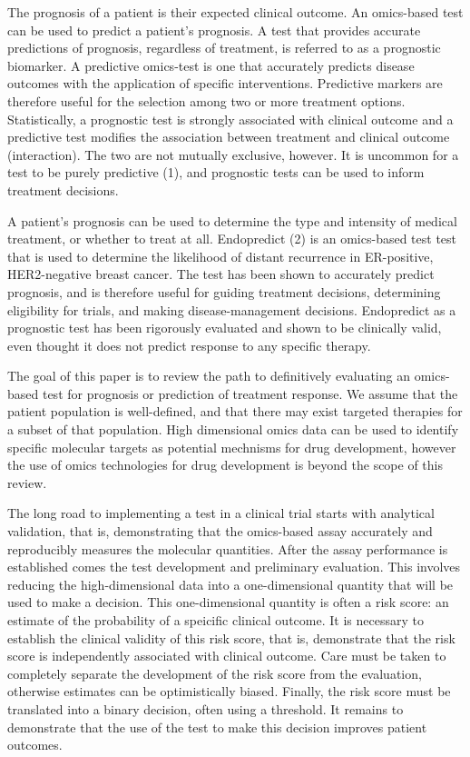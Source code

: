 \documentclass[11pt]{article}
\begin{document}
The prognosis of a patient is their expected clinical outcome. An
omics-based test can be used to predict a patient's prognosis. A test
that provides accurate predictions of prognosis, regardless of
treatment, is referred to as a prognostic biomarker. A predictive
omics-test is one that accurately predicts disease outcomes with the
application of specific interventions. Predictive markers are therefore
useful for the selection among two or more treatment options.
Statistically, a prognostic test is strongly associated with clinical
outcome and a predictive test modifies the association between treatment
and clinical outcome (interaction). The two are not mutually exclusive,
however. It is uncommon for a test to be purely predictive (1), and
prognostic tests can be used to inform treatment decisions.

A patient's prognosis can be used to determine the type and intensity of
medical treatment, or whether to treat at all. Endopredict (2) is an
omics-based test test that is used to determine the likelihood of
distant recurrence in ER-positive, HER2-negative breast cancer. The test
has been shown to accurately predict prognosis, and is therefore useful
for guiding treatment decisions, determining eligibility for trials, and
making disease-management decisions. Endopredict as a prognostic test
has been rigorously evaluated and shown to be clinically valid, even
thought it does not predict response to any specific therapy.

The goal of this paper is to review the path to definitively evaluating
an omics-based test for prognosis or prediction of treatment response.
We assume that the patient population is well-defined, and that there
may exist targeted therapies for a subset of that population. High
dimensional omics data can be used to identify specific molecular
targets as potential mechnisms for drug development, however the use of
omics technologies for drug development is beyond the scope of this
review.

The long road to implementing a test in a clinical trial starts with
analytical validation, that is, demonstrating that the omics-based assay
accurately and reproducibly measures the molecular quantities. After the
assay performance is established comes the test development and
preliminary evaluation. This involves reducing the high-dimensional data
into a one-dimensional quantity that will be used to make a decision.
This one-dimensional quantity is often a risk score: an estimate of the
probability of a speicific clinical outcome. It is necessary to
establish the clinical validity of this risk score, that is, demonstrate
that the risk score is independently associated with clinical outcome.
Care must be taken to completely separate the development of the risk
score from the evaluation, otherwise estimates can be optimistically
biased. Finally, the risk score must be translated into a binary
decision, often using a threshold. It remains to demonstrate that the
use of the test to make this decision improves patient outcomes.
\end{document}
